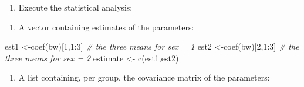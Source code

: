 \documentclass[
]{book}
\newenvironment{Shaded}{\begin{snugshade}}{\end{snugshade}}
\newcommand{\AttributeTok}[1]{\textcolor[rgb]{0.77,0.63,0.00}{#1}}
\newcommand{\CommentTok}[1]{\textcolor[rgb]{0.56,0.35,0.01}{\textit{#1}}}
\newcommand{\DecValTok}[1]{\textcolor[rgb]{0.00,0.00,0.81}{#1}}
\newcommand{\FunctionTok}[1]{\textcolor[rgb]{0.00,0.00,0.00}{#1}}
\newcommand{\NormalTok}[1]{#1}
\newcommand{\OtherTok}[1]{\textcolor[rgb]{0.56,0.35,0.01}{#1}}
\newcommand{\SpecialCharTok}[1]{\textcolor[rgb]{0.00,0.00,0.00}{#1}}
\providecommand{\tightlist}{%
  \setlength{\itemsep}{0pt}\setlength{\parskip}{0pt}}
\begin{document}
\begin{enumerate}
\def\labelenumi{\arabic{enumi})}
\tightlist
\item
  Execute the statistical analysis:
\end{enumerate}

\begin{Shaded}
\end{Shaded}

\begin{enumerate}
\def\labelenumi{\alph{enumi})}
\tightlist
\item
  A vector containing estimates of the parameters:
\end{enumerate}

\begin{Shaded}
\begin{Highlighting}[]
\NormalTok{est1 }\OtherTok{\textless{}{-}}\FunctionTok{coef}\NormalTok{(bw)[}\DecValTok{1}\NormalTok{,}\DecValTok{1}\SpecialCharTok{:}\DecValTok{3}\NormalTok{] }\CommentTok{\# the three means for sex = 1}
\NormalTok{est2 }\OtherTok{\textless{}{-}}\FunctionTok{coef}\NormalTok{(bw)[}\DecValTok{2}\NormalTok{,}\DecValTok{1}\SpecialCharTok{:}\DecValTok{3}\NormalTok{] }\CommentTok{\# the three means for sex = 2}
\NormalTok{estimate }\OtherTok{\textless{}{-}} \FunctionTok{c}\NormalTok{(est1,est2)}
\end{Highlighting}
\end{Shaded}

\begin{enumerate}
\def\labelenumi{\alph{enumi})}
\setcounter{enumi}{1}
\tightlist
\item
  A list containing, per group, the covariance
  matrix of the parameters:
\end{enumerate}
\end{document}

